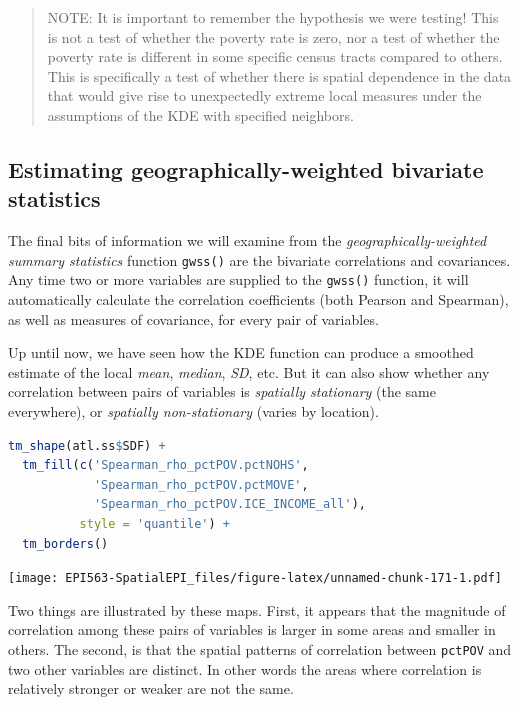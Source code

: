 \documentclass[
]{book}
\newcommand{\passthrough}[1]{#1}
\begin{document}
\begin{quote}
NOTE: It is important to remember the hypothesis we were testing! This is not a test of whether the poverty rate is zero, nor a test of whether the poverty rate is different in some specific census tracts compared to others. This is specifically a test of whether there is spatial dependence in the data that would give rise to unexpectedly extreme local measures under the assumptions of the KDE with specified neighbors.
\end{quote}

\hypertarget{estimating-geographically-weighted-bivariate-statistics}{%
\subsection{Estimating geographically-weighted bivariate statistics}\label{estimating-geographically-weighted-bivariate-statistics}}

The final bits of information we will examine from the \emph{geographically-weighted summary statistics} function \passthrough{\lstinline!gwss()!} are the bivariate correlations and covariances. Any time two or more variables are supplied to the \passthrough{\lstinline!gwss()!} function, it will automatically calculate the correlation coefficients (both Pearson and Spearman), as well as measures of covariance, for every pair of variables.

Up until now, we have seen how the KDE function can produce a smoothed estimate of the local \emph{mean}, \emph{median}, \emph{SD}, etc. But it can also show whether any correlation between pairs of variables is \emph{spatially stationary} (the same everywhere), or \emph{spatially non-stationary} (varies by location).

\begin{lstlisting}[language=R]
tm_shape(atl.ss$SDF) +
  tm_fill(c('Spearman_rho_pctPOV.pctNOHS',
            'Spearman_rho_pctPOV.pctMOVE',
            'Spearman_rho_pctPOV.ICE_INCOME_all'),
          style = 'quantile') +
  tm_borders()
\end{lstlisting}

\texttt{[image: EPI563-SpatialEPI\_files/figure-latex/unnamed-chunk-171-1.pdf]}

Two things are illustrated by these maps. First, it appears that the magnitude of correlation among these pairs of variables is larger in some areas and smaller in others. The second, is that the spatial patterns of correlation between \passthrough{\lstinline!pctPOV!} and two other variables are distinct. In other words the areas where correlation is relatively stronger or weaker are not the same.
\end{document}
